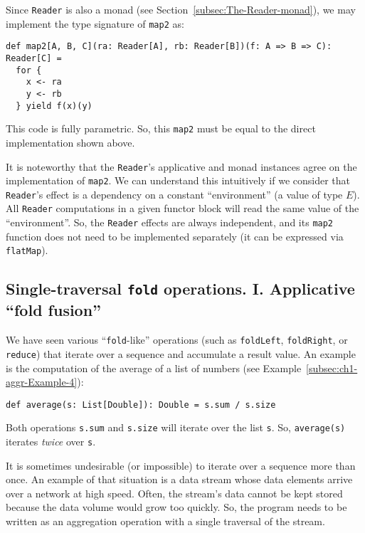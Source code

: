 Since \lstinline!Reader! is also a monad (see Section~\ref{subsec:The-Reader-monad}),
we may implement the type signature of \lstinline!map2! as:
\begin{lstlisting}
def map2[A, B, C](ra: Reader[A], rb: Reader[B])(f: A => B => C): Reader[C] =
  for {
    x <- ra
    y <- rb
  } yield f(x)(y)
\end{lstlisting}
This code is fully parametric. So, this \lstinline!map2! must be
equal to the direct implementation shown above.

It is noteworthy that the \lstinline!Reader!\textsf{'}s applicative and monad
instances agree on the implementation of \lstinline!map2!. We can
understand this intuitively if we consider that \lstinline!Reader!\textsf{'}s
effect is a dependency on a constant \textsf{``}environment\textsf{''} (a value of
type $E$). All \lstinline!Reader! computations in a given functor
block will read the same value of the \textsf{``}environment\textsf{''}. So, the \lstinline!Reader!
effects are always independent, and its \lstinline!map2! function
does not need to be implemented separately (it can be expressed via
\lstinline!flatMap!).

\subsection{Single-traversal \texttt{fold} operations. I. Applicative \textquotedblleft fold
fusion\textquotedblright\label{subsec:Single-traversal-fold-operations-applicative-fold-fusion}}

We have seen various \textsf{``}\lstinline!fold!-like\textsf{''} operations (such
as \lstinline!foldLeft!, \lstinline!foldRight!, or \lstinline!reduce!)
that iterate over a sequence and accumulate a result value. An example
is the computation of the average of a list of numbers (see Example~\ref{subsec:ch1-aggr-Example-4}):
\begin{lstlisting}
def average(s: List[Double]): Double = s.sum / s.size
\end{lstlisting}
Both operations \lstinline!s.sum! and \lstinline!s.size! will iterate
over the list \lstinline!s!. So, \lstinline!average(s)! iterates
\emph{twice} over \lstinline!s!.

It is sometimes undesirable (or impossible) to iterate over a sequence
more than once. An example of that situation is a data stream whose
data elements arrive over a network at high speed. Often, the stream\textsf{'}s
data cannot be kept stored because the data volume would grow too
quickly. So, the program needs to be written as an aggregation
operation with a single traversal of the stream. 

